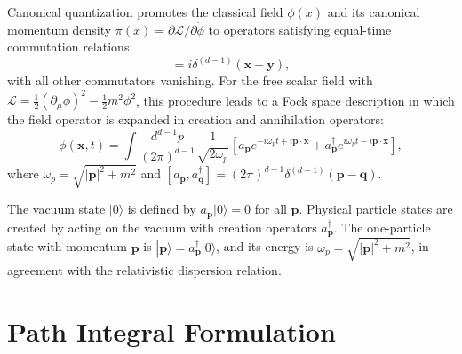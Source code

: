 \documentclass[11pt, twoside, openright]{book}
\theoremstyle{dotted}
\theoremstyle{definition}
\begin{document}
Canonical quantization promotes the classical field $\phi(x)$ and its canonical
momentum density $\pi(x) = \partial\mathcal{L}/\partial\dot\phi$ to operators
satisfying equal-time commutation relations:
\begin{equation}
  [\phi(\mathbf{x}, t), \pi(\mathbf{y}, t)] = i\delta^{(d-1)}(\mathbf{x} - \mathbf{y}),
  \label{eq:canonical_comm}
\end{equation}
with all other commutators vanishing. For the free scalar field with
$\mathcal{L} = \frac{1}{2}(\partial_\mu\phi)^2 - \frac{1}{2}m^2\phi^2$, this
procedure leads to a Fock space description in which the field operator is
expanded in creation and annihilation operators:
\begin{equation}
  \phi(\mathbf{x}, t) = \int \frac{d^{d-1}p}{(2\pi)^{d-1}}\frac{1}{\sqrt{2\omega_p}}
  \left[a_{\mathbf{p}}e^{-i\omega_pt + i\mathbf{p}\cdot\mathbf{x}}
  + a^\dagger_{\mathbf{p}}e^{i\omega_pt - i\mathbf{p}\cdot\mathbf{x}}\right],
  \label{eq:mode_expansion}
\end{equation}
where $\omega_p = \sqrt{|\mathbf{p}|^2 + m^2}$ and $[a_{\mathbf{p}}, a^\dagger_{\mathbf{q}}]
= (2\pi)^{d-1}\delta^{(d-1)}(\mathbf{p} - \mathbf{q})$.

The vacuum state $|0\rangle$ is defined by $a_{\mathbf{p}}|0\rangle = 0$ for all
$\mathbf{p}$. Physical particle states are created by acting on the vacuum with
creation operators $a^\dagger_{\mathbf{p}}$. The one-particle state with momentum
$\mathbf{p}$ is $|\mathbf{p}\rangle = a^\dagger_{\mathbf{p}}|0\rangle$, and its
energy is $\omega_p = \sqrt{|\mathbf{p}|^2 + m^2}$, in agreement with the
relativistic dispersion relation.

\section{Path Integral Formulation}
\end{document}
